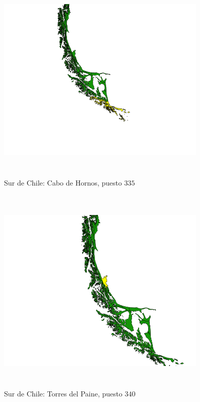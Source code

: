 \documentclass[20pt]{report}
\begin{document}
\begin{itemize}
\begin{figure}[H]
\begin{center}
\includegraphics[width=10cm, height=10cm]{cabodehornos.png}
\vspace{-0.5cm} %
\caption{Sur de Chile: Cabo de Hornos, puesto $335$}
\label{Label para referencia}
\end{center}
\end{figure}










\begin{figure}[H]
\begin{center}
\includegraphics[width=10cm, height=10cm]{torresdelpaine340.png}
\vspace{-0.5cm} %
\caption{Sur de Chile: Torres del Paine, puesto $340$}
\label{Label para referencia}
\end{center}
\end{figure}

\end{itemize}
\end{document}
